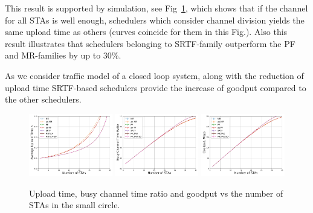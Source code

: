 This result is supported by simulation, see Fig~\ref{fig:10metres}, which shows that if the channel for all STAs is well enough, schedulers which consider channel division yields the same upload time as others (curves coincide for them in this Fig.). Also this result illustrates that schedulers belonging to SRTF-family outperform the PF and MR-families by up to 30\%. 

As we consider traffic model of a closed loop system, along with the reduction of upload time SRTF-based schedulers provide the increase of goodput compared to the other schedulers.

\begin{figure}[tb]
  \centering
  \includegraphics[width = 0.325\textwidth]{5-d.pdf}
  \includegraphics[width = 0.325\textwidth]{5-e.pdf}
  \includegraphics[width = 0.325\textwidth]{5-t.pdf}
  \caption{\label{fig:10metres}  Upload time, busy channel time ratio and goodput vs the number of STAs in the small circle.}
\end{figure}

